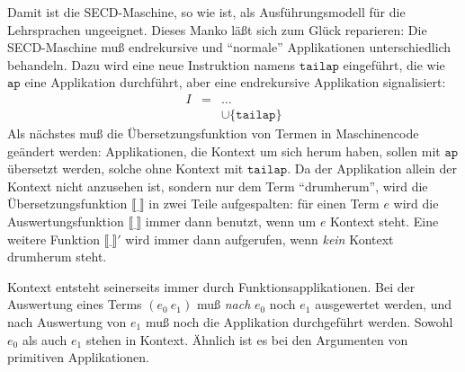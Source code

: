 %
Damit ist die SECD-Maschine, so wie ist, als Ausführungsmodell für
die Lehrsprachen ungeeignet.  Dieses Manko läßt sich zum Glück reparieren: Die
SECD-Maschine muß endrekursive und "`normale"' Applikationen
unterschiedlich behandeln.  Dazu wird eine neue Instruktion namens
$\mathtt{tailap}$ eingeführt, die wie $\mathtt{ap}$ eine Applikation
durchführt, aber eine endrekursive Applikation signalisiert:
%
\begin{eqnarray*}
  I &=& \ldots\\
  &&\cup \{ \mathtt{tailap} \}
\end{eqnarray*}
%
Als nächstes muß die Übersetzungsfunktion von Termen in Maschinencode
geändert werden:  Applikationen, die Kontext um sich herum haben,
sollen mit $\mathtt{ap}$ übersetzt werden, solche ohne Kontext mit
$\mathtt{tailap}$.  Da der Applikation allein der Kontext nicht
anzusehen ist, sondern nur dem Term "`drumherum"', wird die
Übersetzungsfunktion $\llbracket \underline{~} \rrbracket$ in zwei
Teile aufgespalten: für einen Term $e$ wird die Auswertungsfunktion $\llbracket\underline{~}\rrbracket$ immer dann benutzt, wenn um $e$ Kontext steht.  Eine
weitere Funktion $\llbracket \underline{~} \rrbracket'$ wird immer
dann aufgerufen, wenn \emph{kein} Kontext drumherum steht.

Kontext entsteht seinerseits immer durch Funktionsapplikationen.  Bei
der Auswertung eines Terms $(e_0~e_1)$ muß \emph{nach} $e_0$ noch
$e_1$ ausgewertet werden, und nach Auswertung von $e_1$ muß noch die
Applikation durchgeführt werden.  Sowohl $e_0$ als auch $e_1$ stehen
in Kontext.  Ähnlich ist es bei den Argumenten von primitiven
Applikationen.


